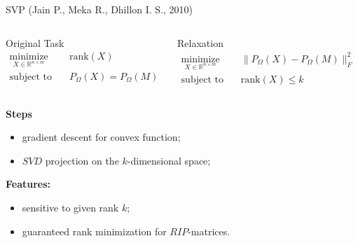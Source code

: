 \documentclass{beamer}
\begin{document}
\begin{frame}{SVP (Jain P., Meka R., Dhillon I. S., 2010)}
\begin{columns}[c]
	\begin{block}{Original Task}
		\vspace{-0.5cm}
		\begin{align*}
		\mathop{\text{minimize}}\limits_{X \in \mathbb{R}^{n \times m}} \quad & 
		\text{rank} (X) \\
		\text{subject to} \quad & P_{\Omega} (X) = P_{\Omega} (M)
		\end{align*}
	\end{block}
	
	\begin{block}{Relaxation}
		\vspace{-0.5cm}
		\begin{align*}
		\mathop{\text{minimize}}\limits_{X \in \mathbb{R}^{n \times m}} \quad & 
		\| P_{\Omega} (X) - P_{\Omega} (M) \|_F^2 \\
		\text{subject to} \quad & \text{rank} (X) \leq k
		\end{align*}
	\end{block}
\end{columns}
\vspace{0.3cm}
\textbf{Steps}

\begin{itemize}
	\item gradient descent  for convex function;
	\item $SVD$ projection on the $k$-dimensional space;
\end{itemize}
\textbf{Features:}
\begin{itemize}
	\item sensitive to given rank $k$;
	\item guaranteed rank minimization for $RIP$-matrices.
\end{itemize}

\end{frame}
\end{document}
